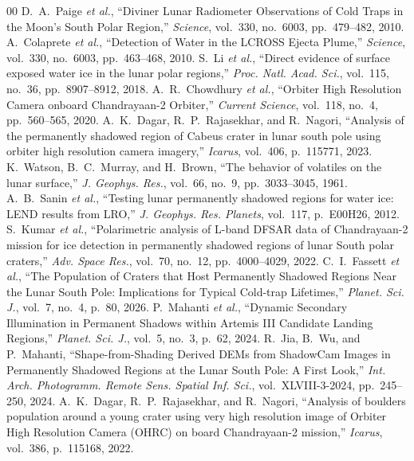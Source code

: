 \documentclass[journal]{IEEEtran}
\begin{document}
\begin{thebibliography}{00}
 D.~A.~Paige \textit{et al.}, ``Diviner Lunar Radiometer Observations of Cold Traps in the Moon's South Polar Region,'' \textit{Science}, vol.~330, no.~6003, pp.~479--482, 2010.
 A.~Colaprete \textit{et al.}, ``Detection of Water in the LCROSS Ejecta Plume,'' \textit{Science}, vol.~330, no.~6003, pp.~463--468, 2010.
 S.~Li \textit{et al.}, ``Direct evidence of surface exposed water ice in the lunar polar regions,'' \textit{Proc. Natl. Acad. Sci.}, vol.~115, no.~36, pp.~8907--8912, 2018.
 A.~R.~Chowdhury \textit{et al.}, ``Orbiter High Resolution Camera onboard Chandrayaan-2 Orbiter,'' \textit{Current Science}, vol.~118, no.~4, pp.~560--565, 2020.
 A.~K.~Dagar, R.~P.~Rajasekhar, and R.~Nagori, ``Analysis of the permanently shadowed region of Cabeus crater in lunar south pole using orbiter high resolution camera imagery,'' \textit{Icarus}, vol.~406, p.~115771, 2023.
 K.~Watson, B.~C.~Murray, and H.~Brown, ``The behavior of volatiles on the lunar surface,'' \textit{J. Geophys. Res.}, vol.~66, no.~9, pp.~3033--3045, 1961.
 A.~B.~Sanin \textit{et al.}, ``Testing lunar permanently shadowed regions for water ice: LEND results from LRO,'' \textit{J. Geophys. Res. Planets}, vol.~117, p.~E00H26, 2012.
 S.~Kumar \textit{et al.}, ``Polarimetric analysis of L-band DFSAR data of Chandrayaan-2 mission for ice detection in permanently shadowed regions of lunar South polar craters,'' \textit{Adv. Space Res.}, vol.~70, no.~12, pp.~4000--4029, 2022.
 C.~I.~Fassett \textit{et al.}, ``The Population of Craters that Host Permanently Shadowed Regions Near the Lunar South Pole: Implications for Typical Cold-trap Lifetimes,'' \textit{Planet. Sci. J.}, vol.~7, no.~4, p.~80, 2026.
 P.~Mahanti \textit{et al.}, ``Dynamic Secondary Illumination in Permanent Shadows within Artemis III Candidate Landing Regions,'' \textit{Planet. Sci. J.}, vol.~5, no.~3, p.~62, 2024.
 R.~Jia, B.~Wu, and P.~Mahanti, ``Shape-from-Shading Derived DEMs from ShadowCam Images in Permanently Shadowed Regions at the Lunar South Pole: A First Look,'' \textit{Int. Arch. Photogramm. Remote Sens. Spatial Inf. Sci.}, vol.~XLVIII-3-2024, pp.~245--250, 2024.
 A.~K.~Dagar, R.~P.~Rajasekhar, and R.~Nagori, ``Analysis of boulders population around a young crater using very high resolution image of Orbiter High Resolution Camera (OHRC) on board Chandrayaan-2 mission,'' \textit{Icarus}, vol.~386, p.~115168, 2022.

\end{thebibliography}
\end{document}
